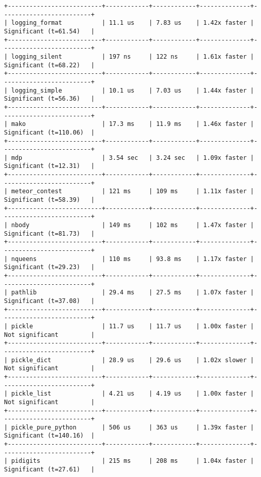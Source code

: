 \begin{code}
\begin{verbatim}
+--------------------------+------------+------------+--------------+-------------------------+
| logging_format           | 11.1 us    | 7.83 us    | 1.42x faster | Significant (t=61.54)   |
+--------------------------+------------+------------+--------------+-------------------------+
| logging_silent           | 197 ns     | 122 ns     | 1.61x faster | Significant (t=68.22)   |
+--------------------------+------------+------------+--------------+-------------------------+
| logging_simple           | 10.1 us    | 7.03 us    | 1.44x faster | Significant (t=56.36)   |
+--------------------------+------------+------------+--------------+-------------------------+
| mako                     | 17.3 ms    | 11.9 ms    | 1.46x faster | Significant (t=110.06)  |
+--------------------------+------------+------------+--------------+-------------------------+
| mdp                      | 3.54 sec   | 3.24 sec   | 1.09x faster | Significant (t=12.31)   |
+--------------------------+------------+------------+--------------+-------------------------+
| meteor_contest           | 121 ms     | 109 ms     | 1.11x faster | Significant (t=58.39)   |
+--------------------------+------------+------------+--------------+-------------------------+
| nbody                    | 149 ms     | 102 ms     | 1.47x faster | Significant (t=81.73)   |
+--------------------------+------------+------------+--------------+-------------------------+
| nqueens                  | 110 ms     | 93.8 ms    | 1.17x faster | Significant (t=29.23)   |
+--------------------------+------------+------------+--------------+-------------------------+
| pathlib                  | 29.4 ms    | 27.5 ms    | 1.07x faster | Significant (t=37.08)   |
+--------------------------+------------+------------+--------------+-------------------------+
| pickle                   | 11.7 us    | 11.7 us    | 1.00x faster | Not significant         |
+--------------------------+------------+------------+--------------+-------------------------+
| pickle_dict              | 28.9 us    | 29.6 us    | 1.02x slower | Not significant         |
+--------------------------+------------+------------+--------------+-------------------------+
| pickle_list              | 4.21 us    | 4.19 us    | 1.00x faster | Not significant         |
+--------------------------+------------+------------+--------------+-------------------------+
| pickle_pure_python       | 506 us     | 363 us     | 1.39x faster | Significant (t=140.16)  |
+--------------------------+------------+------------+--------------+-------------------------+
| pidigits                 | 215 ms     | 208 ms     | 1.04x faster | Significant (t=27.61)   |

\end{verbatim}
\end{code}
